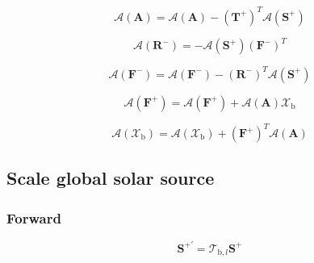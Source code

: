 \begin{equation}
\mathcal{A}(\mathbf{A}) = \mathcal{A}(\mathbf{A}) - (\mathbf{T}^{+})^{T}\mathcal{A}(\mathbf{S}^{+})
\label{eq:solar_source-global_solar_source-adjoint_of_tangent_linear-A_a2}
\end{equation}

\begin{equation}
\mathcal{A}(\mathbf{R}^{-}) = -\mathcal{A}(\mathbf{S}^{+})(\mathbf{F}^{-})^{T}
\label{eq:solar_source-global_solar_source-adjoint_of_tangent_linear-R_m_a}
\end{equation}

\begin{equation}
\mathcal{A}(\mathbf{F}^{-}) = \mathcal{A}(\mathbf{F}^{-}) - (\mathbf{R}^{-})^{T}\mathcal{A}(\mathbf{S}^{+})
\label{eq:solar_source-global_solar_source-adjoint_of_tangent_linear-f_m_a3}
\end{equation}

\begin{equation}
\mathcal{A}(\mathbf{F}^{+}) = \mathcal{A}(\mathbf{F}^{+}) + \mathcal{A}(\mathbf{A})\mathcal{X}_{\mathrm{b}}
\label{eq:solar_source-global_solar_source-adjoint_of_tangent_linear-f_p_a2}
\end{equation}

\begin{equation}
\mathcal{A}(\mathcal{X}_{\mathrm{b}}) = \mathcal{A}(\mathcal{X}_{\mathrm{b}}) + (\mathbf{F}^{+})^{T}\mathcal{A}(\mathbf{A})
\label{eq:solar_source-global_solar_source-adjoint_of_tangent_linear-t_a2}
\end{equation}


%
\subsection{Scale global solar source}
\label{sec:solar_source-scale_global_solar_source}


\subsubsection{Forward}
\label{sec:solar_source-scale_global_solar_source-forward}

\begin{equation}
\mathbf{S}^{+\prime} = \mathcal{T}_{\mathrm{b},l} \mathbf{S}^{+}
\label{eq:solar_source-scale_global_solar_source-forward-F_p_prime}
\end{equation}


